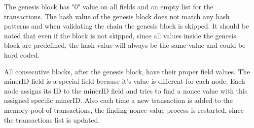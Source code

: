 \documentclass[12pt]{article}
\begin{document}
The genesis block has "0" value on all fields and an empty list for the transactions. The hash value of the genesis block does not match any hash patterns and when validating the chain the genesis block is skipped. It should be noted that even if the block is not skipped, since all values inside the genesis block are predefined, the hash value will always be the same value and could be hard coded.

All consecutive blocks, after the genesis block, have their proper field values. The minerID field is a special field because it's value is different for each node. Each node assigns its ID to the minerID field and tries to find a nonce value with this assigned specific minerID. Also each time a new transaction is added to the memory pool of transactions, the finding nonce value process is restarted, since the transactions list is updated.
\end{document}
